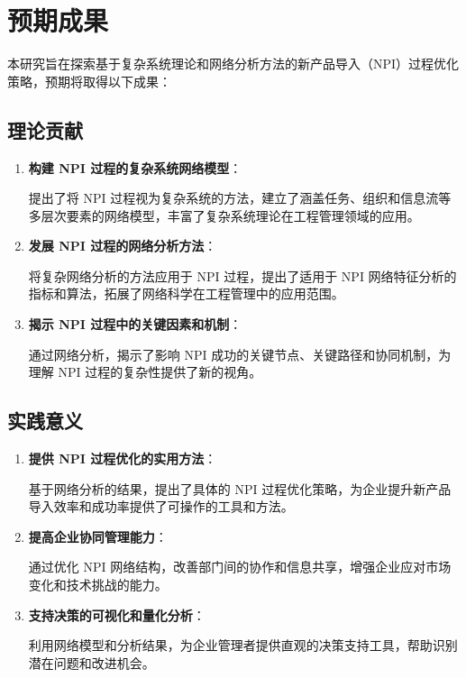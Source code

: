 \chapter{预期成果}

本研究旨在探索基于复杂系统理论和网络分析方法的新产品导入（NPI）过程优化策略，预期将取得以下成果：

\section{理论贡献}

\begin{enumerate}
  \item \textbf{构建 NPI 过程的复杂系统网络模型}：

  提出了将 NPI 过程视为复杂系统的方法，建立了涵盖任务、组织和信息流等多层次要素的网络模型，丰富了复杂系统理论在工程管理领域的应用。

  \item \textbf{发展 NPI 过程的网络分析方法}：

  将复杂网络分析的方法应用于 NPI 过程，提出了适用于 NPI 网络特征分析的指标和算法，拓展了网络科学在工程管理中的应用范围。

  \item \textbf{揭示 NPI 过程中的关键因素和机制}：

  通过网络分析，揭示了影响 NPI 成功的关键节点、关键路径和协同机制，为理解 NPI 过程的复杂性提供了新的视角。

\end{enumerate}

\section{实践意义}

\begin{enumerate}
  \item \textbf{提供 NPI 过程优化的实用方法}：

  基于网络分析的结果，提出了具体的 NPI 过程优化策略，为企业提升新产品导入效率和成功率提供了可操作的工具和方法。

  \item \textbf{提高企业协同管理能力}：

  通过优化 NPI 网络结构，改善部门间的协作和信息共享，增强企业应对市场变化和技术挑战的能力。

  \item \textbf{支持决策的可视化和量化分析}：

  利用网络模型和分析结果，为企业管理者提供直观的决策支持工具，帮助识别潜在问题和改进机会。

\end{enumerate}

